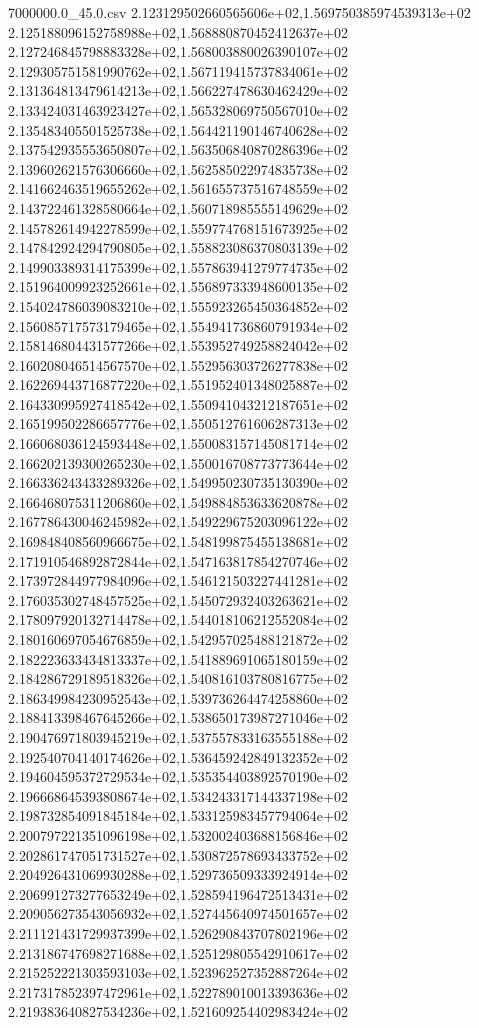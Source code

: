 \begin{filecontents*}{7000000.0_45.0.csv}
2.123129502660565606e+02,1.569750385974539313e+02
2.125188096152758988e+02,1.568880870452412637e+02
2.127246845798883328e+02,1.568003880026390107e+02
2.129305751581990762e+02,1.567119415737834061e+02
2.131364813479614213e+02,1.566227478630462429e+02
2.133424031463923427e+02,1.565328069750567010e+02
2.135483405501525738e+02,1.564421190146740628e+02
2.137542935553650807e+02,1.563506840870286396e+02
2.139602621576306660e+02,1.562585022974835738e+02
2.141662463519655262e+02,1.561655737516748559e+02
2.143722461328580664e+02,1.560718985555149629e+02
2.145782614942278599e+02,1.559774768151673925e+02
2.147842924294790805e+02,1.558823086370803139e+02
2.149903389314175399e+02,1.557863941279774735e+02
2.151964009923252661e+02,1.556897333948600135e+02
2.154024786039083210e+02,1.555923265450364852e+02
2.156085717573179465e+02,1.554941736860791934e+02
2.158146804431577266e+02,1.553952749258824042e+02
2.160208046514567570e+02,1.552956303726277838e+02
2.162269443716877220e+02,1.551952401348025887e+02
2.164330995927418542e+02,1.550941043212187651e+02
2.165199502286657776e+02,1.550512761606287313e+02
2.166068036124593448e+02,1.550083157145081714e+02
2.166202139300265230e+02,1.550016708773773644e+02
2.166336243433289326e+02,1.549950230735130390e+02
2.166468075311206860e+02,1.549884853633620878e+02
2.167786430046245982e+02,1.549229675203096122e+02
2.169848408560966675e+02,1.548199875455138681e+02
2.171910546892872844e+02,1.547163817854270746e+02
2.173972844977984096e+02,1.546121503227441281e+02
2.176035302748457525e+02,1.545072932403263621e+02
2.178097920132714478e+02,1.544018106212552084e+02
2.180160697054676859e+02,1.542957025488121872e+02
2.182223633434813337e+02,1.541889691065180159e+02
2.184286729189518326e+02,1.540816103780816775e+02
2.186349984230952543e+02,1.539736264474258860e+02
2.188413398467645266e+02,1.538650173987271046e+02
2.190476971803945219e+02,1.537557833163555188e+02
2.192540704140174626e+02,1.536459242849132352e+02
2.194604595372729534e+02,1.535354403892570190e+02
2.196668645393808674e+02,1.534243317144337198e+02
2.198732854091845184e+02,1.533125983457794064e+02
2.200797221351096198e+02,1.532002403688156846e+02
2.202861747051731527e+02,1.530872578693433752e+02
2.204926431069930288e+02,1.529736509333924914e+02
2.206991273277653249e+02,1.528594196472513431e+02
2.209056273543056932e+02,1.527445640974501657e+02
2.211121431729937399e+02,1.526290843707802196e+02
2.213186747698271688e+02,1.525129805542910617e+02
2.215252221303593103e+02,1.523962527352887264e+02
2.217317852397472961e+02,1.522789010013393636e+02
2.219383640827534236e+02,1.521609254402983424e+02

\end{filecontents*}
